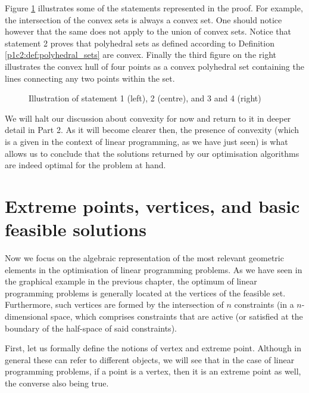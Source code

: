Figure \ref{p1c2:fig:convexity_theorem_examples} illustrates some of the statements represented in the proof. For example, the intersection of the convex sets is always a convex set. One should notice however that the same does not apply to the union of convex sets. Notice that statement 2 proves that polyhedral sets as defined according to Definition \ref{p1c2:def:polyhedral_sets} are convex. Finally the third figure on the right illustrates the convex hull of four points as a convex polyhedral set containing the lines connecting any two points within the set. 
 
\begin{figure}
    \vspace{-6pt}
	\caption{Illustration of statement 1 (left), 2 (centre), and 3 and 4 (right)} \label{p1c2:fig:convexity_theorem_examples}
\end{figure}	

We will halt our discussion about convexity for now and return to it in deeper detail in Part 2. As it will become clearer then, the presence of convexity (which is a given in the context of linear programming, as we have just seen) is what allows us to conclude that the solutions returned by our optimisation algorithms are indeed optimal for the problem at hand. 


\section{Extreme points, vertices, and basic feasible solutions}

Now we focus on the algebraic representation of the most relevant geometric elements in the optimisation of linear programming problems. As we have seen in the graphical example in the previous chapter, the optimum of linear programming problems is generally located at the vertices of the feasible set. Furthermore, such vertices are formed by the intersection of $n$ constraints (in a $n$-dimensional space, which comprises constraints that are active (or satisfied at the boundary of the half-space of said constraints).

First, let us formally define the notions of vertex and extreme point. Although in general these can refer to different objects, we will see that in the case of linear programming problems, if a point is a vertex, then it is an extreme point as well, the converse also being true.

